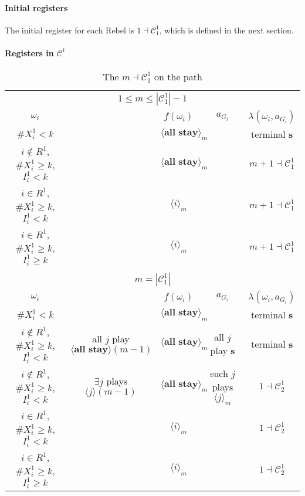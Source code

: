 \documentclass[12pt,letter]{article}
\newcommand{\Kappa}{\mathcal{C}}
\theoremstyle{definition}
\theoremstyle{remark}
\theoremstyle{claim}
\begin{document}
\paragraph{Initial registers}
The initial register for each Rebel is $1\dashv\Kappa^1_1$, which is defined in the next section.
\paragraph{Registers in $\Kappa^1$}

\begin{landscape}
\begin{table}[!htbp]
\caption{The $m\dashv\Kappa^1_{1}$ on the path}
\label{table:eqm_path_k01}
\begin{center}
\begin{tabular}{c c | c | c | c }
\multicolumn{5}{c}{$1\leq m \leq |\Kappa^1_1|-1$}\\
$\omega_i$ 	 & 	   &	$f(\omega_i)$  &	$a_{G_i}$ & $\lambda(\omega_i,a_{G_i})$ \\
\hline
\hline
$\# X^1_i<k$  	& 	 &$\langle \textbf{all stay} \rangle_m$ &	& terminal \textbf{s}\\
$i\notin R^1$, $\# X^1_i\geq k$, $I^1_i< k$  	&  &$\langle \textbf{all stay} \rangle_m$ & 	& $m+1\dashv\Kappa^1_{1}$\\
$i\in R^1$, $\# X^1_i\geq k$, $I^1_i< k$  	& 	 &$\langle i \rangle_m$	&  & $m+1\dashv \Kappa^1_{1}$\\
$i\in R^1$, $\# X^1_i\geq k$, $I^1_i\geq k$  	& 	 &$\langle i \rangle_m$	&  & $m+1\dashv \Kappa^1_{1}$\\
\hline
\\
\multicolumn{5}{c}{$m=|\Kappa^1_1|$}\\
$\omega_i$ 	 & 	   &	$f(\omega_i)$  &	$a_{G_i}$ & $\lambda(\omega_i,a_{G_i})$ \\
\hline
\hline
$\# X^1_i<k$  	& 	& $\langle \textbf{all stay} \rangle_m$	&     & terminal \textbf{s}\\
$i\notin R^1$, $\# X^1_i\geq k$, $I^1_i< k$   	& all $j$ play $\langle \textbf{all stay} \rangle(m-1)$ & $\langle \textbf{all stay} \rangle_m$	 & all $j$ play \textbf{s} & terminal \textbf{s}\\
$i\notin R^1$, $\# X^1_i\geq k$, $I^1_i< k$   	& $\exists j$ plays $\langle j \rangle(m-1)$ & $\langle \textbf{all stay} \rangle_m$	& such $j$ plays $\langle j \rangle_m$  & $1\dashv \Kappa^1_2$\\
$i\in R^1$, $\# X^1_i\geq k$, $I^1_i< k$   	& 	& $\langle i \rangle_m$	&& $1\dashv \Kappa^1_2$ \\
$i\in R^1$, $\# X^1_i\geq k$, $I^1_i\geq k$  	& 	& $\langle i \rangle_m$ &	& $1\dashv \Kappa^1_2$ \\
\hline
\end{tabular}
\end{center}
\end{table}



\end{landscape}
\end{document}
